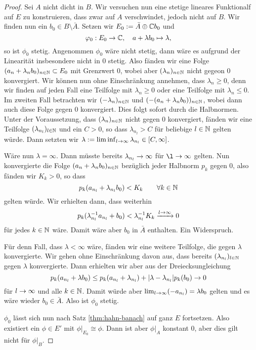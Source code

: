 \begin{proof}
  Sei $A$ nicht dicht in $B$. Wir versuchen nun eine stetige lineares
  Funktionalf auf $E$ zu konstruieren, dass zwar auf $A$ verschwindet,
  jedoch nicht auf $B$. Wir finden nun ein $b_0 \in B \setminus
  \bar A$. Setzen wir $E_0 := \bar A \oplus \mathbb{C} b_0$ und
  \[
  \varphi_0: E_0 \rightarrow \mathbb{C}, \quad a + \lambda b_0 \mapsto \lambda,
  \]
  so ist $\phi_0$ stetig. Angenommen $\phi_0$ wäre nicht stetig, dann
  wäre es aufgrund der Linearität insbesondere nicht in $0$
  stetig. Also fänden wir eine Folge $(a_n + \lambda_n b_0)_{n \in
    \mathbb{N}} \subset E_0$ mit Grenzwert $0$, wobei aber $(\lambda_n)_{n \in
    \mathbb{N}}$ nicht gegeon 0 konvergiert. Wir können nun ohne Einschränkung
  annehmen, dass $\lambda_n \geq 0$, denn wir finden auf jeden Fall
  eine Teilfolge mit $\lambda_n \geq 0$ oder eine Teilfolge mit
  $\lambda_n \leq 0$. Im zweiten Fall betrachten wir $(-\lambda_n)_{n
    \in \mathbb{N}}$ und $(-(a_n + \lambda_n b_0))_{n \in \mathbb{N}}$, wobei dann auch
  diese Folge gegen $0$ konvergiert. Dies folgt sofort durch die
  Halbnormen. Unter der Voraussetzung, dass $(\lambda_n)_{n\in\mathbb{N}}$ nicht gegen $0$
  konvergiert, fänden wir eine Teilfolge $(\lambda_{n_l})_{l\in \mathbb{N}}$
  und ein $C > 0$, so dass $\lambda_{n_l} > C$ für beliebige $l \in
  \mathbb{N}$ gelten würde. Dann setzten wir $\lambda := \liminf_{l \rightarrow \infty}
  \lambda_{n_l} \in [C, \infty]$.

  Wäre nun $\lambda = \infty$. Dann müsste bereits
  $\lambda_{n_l} \rightarrow \infty$ für $\l \ra \infty$ gelten. Nun
  konvergierte die Folge $(a_n + \lambda_n b_0)_{n \in \mathbb{N}}$ bezüglich
  jeder Halbnorm $p_k$ gegen 0, also fänden wir $K_k > 0$, so dass
  \[
  p_k(a_{n_l} + \lambda_{n_l}b_0) < K_k \qquad \forall k \in \mathbb{N}
  \]
  gelten würde. Wir erhielten dann, dass weiterhin
  \[
  p_k(\lambda_{n_l}^{-1}a_{n_l} + b_0) < \lambda_{n_l}^{-1} K_k
  \xrightarrow{l \rightarrow \infty} 0
  \]
  für jedes $k \in \mathbb{N}$ wäre. Damit wäre aber $b_0$ in $\bar A$ enthalten. Ein
  Widerspruch.

  Für denn Fall, dass $\lambda < \infty$ wäre, fänden wir eine weitere
  Teilfolge, die gegen $\lambda$ konvergierte. Wir gehen ohne
  Einschränkung davon aus, dass bereits $(\lambda_{n_l})_{l \in \mathbb{N}}$
  gegen $\lambda$ konvergierte. Dann erhielten wir aber aus der
  Dreiecksungleichung
  \[
  p_k(a_{n_l} + \lambda b_0) \leq p_k(a_{n_l} + \lambda_{n_l}) +
  |\lambda - \lambda_{n_l}| p_k(b_0) \rightarrow 0
  \]
  für $l \rightarrow \infty$ und alle $k \in \mathbb{N}$. Damit würde aber $\lim_{l
    \rightarrow \infty}(-a_{n_l}) = \lambda b_0$ gelten und es wäre wieder
  $b_0 \in \bar A$. Also ist $\phi_0$ stetig.
  
  $\phi_0$ lässt sich nun nach Satz \ref{thm:hahn-banach}
  auf ganz $E$ fortsetzen. Also existiert ein $\phi \in E'$ mit
  $\phi|_{E_0} \cong \phi$. Dann ist aber $\phi|_A$ konstant 0, aber
  dies gilt nicht für $\phi|_B$.
\end{proof}

